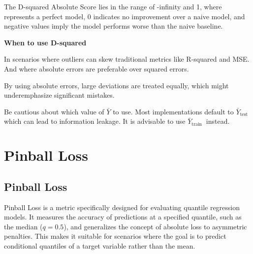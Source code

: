 The D-squared Absolute Score lies in the range of -infinity and 1, where represents a perfect model, 0 indicates no improvement over a naive model,
and negative values imply the model performs worse than the naive baseline.

\textbf{When to use D-squared}

In scenarios where outliers can skew traditional metrics like R-squared and MSE. And where absolute errors are preferable over squared errors.

{
    \item By using absolute errors, large deviations are treated equally, which might underemphasize significant mistakes.
    \item Be cautious about which value of $\bar{Y}$ to use. Most implementations default to $\bar{Y}_{\text {test }}$ which can lead to information leakage. It is advisable to use $\bar{Y}_{\text {train }}$ instead.
}


\clearpage
\thispagestyle{regressionstyle}
\section{Pinball Loss}
\subsection{Pinball Loss }

Pinball Loss is a metric specifically designed for evaluating quantile regression models. It measures the accuracy of predictions at a specified quantile, such as the median ($q=0.5$),
and generalizes the concept of absolute loss to asymmetric penalties. This makes it suitable for scenarios where the goal is to predict conditional quantiles of a target variable
rather than the mean.


